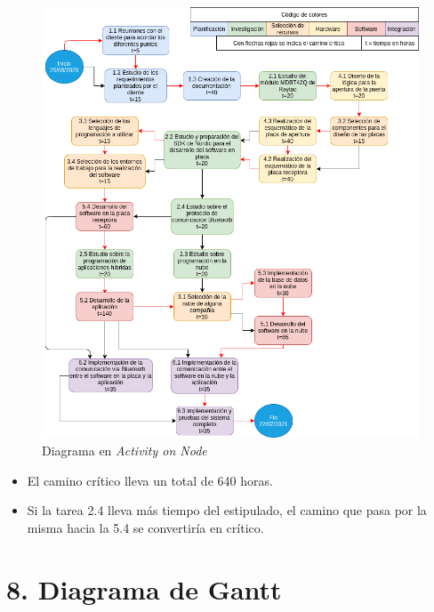 \documentclass[11pt]{charter}
\begin{document}
\begin{figure}[htpb]
\centering 
\includegraphics[width=.9\textwidth]{./Figuras/Aon2.png}
\caption{Diagrama en \textit{Activity on Node}}
\label{fig:AoN}
\end{figure}


\begin{itemize}
\item El camino crítico lleva un total de 640 horas.
\item Si la tarea 2.4 lleva más tiempo del estipulado, el camino que pasa por la misma hacia la 5.4 se convertiría en crítico.
\end{itemize}



\section{8. Diagrama de Gantt}
\label{sec:gantt}
\end{document}
